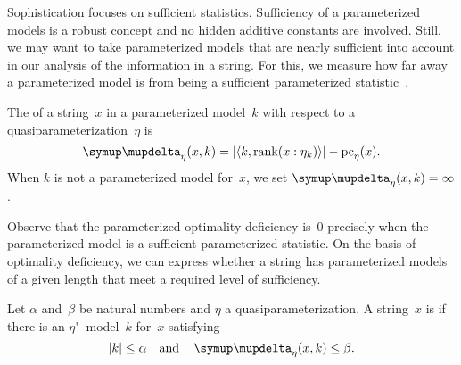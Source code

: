 Sophistication focuses on sufficient statistics.
Sufficiency of a parameterized models is a robust concept and no hidden additive constants are involved.
Still, we may want to take parameterized models that are nearly sufficient into account in our analysis of the information in a string.
For this, we measure how far away a parameterized model is from being a sufficient parameterized statistic~\parencite{vereshchagin2017algorithmic}.
\begin{definition}
  The  of a string~$x$ in a parameterized model~$k$ with respect to a quasiparameterization~$\eta$ is
  \begin{equation*}
    \updelta_\eta(x, k) \deq \length{\pair{k}{\rank(x : \eta_k)}} - \pc_\eta(x).
  \end{equation*}
  When $k$ is not a parameterized model for~$x$, we set $\updelta_\eta(x, k) \deq \infty$.
\end{definition}
Observe that the parameterized optimality deficiency is~$0$ precisely when the parameterized model is a sufficient parameterized statistic.
On the basis of optimality deficiency, we can express whether a string has parameterized models of a given length that meet a required level of sufficiency.
\begin{definition}
  Let $\alpha$ and~$\beta$ be natural numbers and $\eta$ a quasiparameterization.
  A string~$x$ is  if there is an $\eta$"~model~$k$ for~$x$ satisfying
  \begin{equation*}
    \length{k} \le \alpha \quad\text{and}\quad \updelta_\eta(x, k) \le \beta.
  \end{equation*}
\end{definition}

